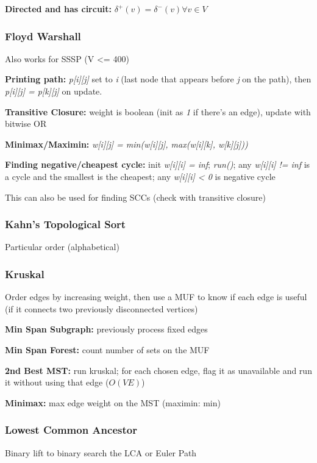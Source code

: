 \documentclass[12pt, a4paper, twoside]{article}
\begin{document}
\textbf{Directed and has circuit:} $\delta^{+}(v) = \delta^{-}(v) \forall v \in V$

\subsubsection{Floyd Warshall}
Also works for SSSP (V <= 400)

\textbf{Printing path:} \textit{p[i][j]} set to \textit{i} (last node that appears before \textit{j} on the path), then \textit{p[i][j] = p[k][j]} on update.

\textbf{Transitive Closure:} weight is boolean (init as \textit{1} if there's an edge), update with bitwise OR

\textbf{Minimax/Maximin:} \textit{w[i][j] = min(w[i][j], max(w[i][k], w[k][j]))}

\textbf{Finding negative/cheapest cycle:} init \textit{w[i][i] = inf}; \textit{run()}; any \textit{w[i][i] != inf} is a cycle and the smallest is the cheapest; any \textit{w[i][i] < 0} is negative cycle

This can also be used for finding SCCs (check with transitive closure)

\subsubsection{Kahn's Topological Sort}
Particular order (alphabetical)

\subsubsection{Kruskal}
Order edges by increasing weight, then use a MUF to know if each edge is useful (if it connects two previously disconnected vertices)

\textbf{Min Span Subgraph:} previously process fixed edges

\textbf{Min Span Forest:} count number of sets on the MUF

\textbf{2nd Best MST:} run kruskal; for each chosen edge, flag it as unavailable and run it without using that edge ($O(VE)$)

\textbf{Minimax:} max edge weight on the MST (maximin: min)

\subsubsection{Lowest Common Ancestor}
Binary lift to binary search the LCA or Euler Path
\end{document}
